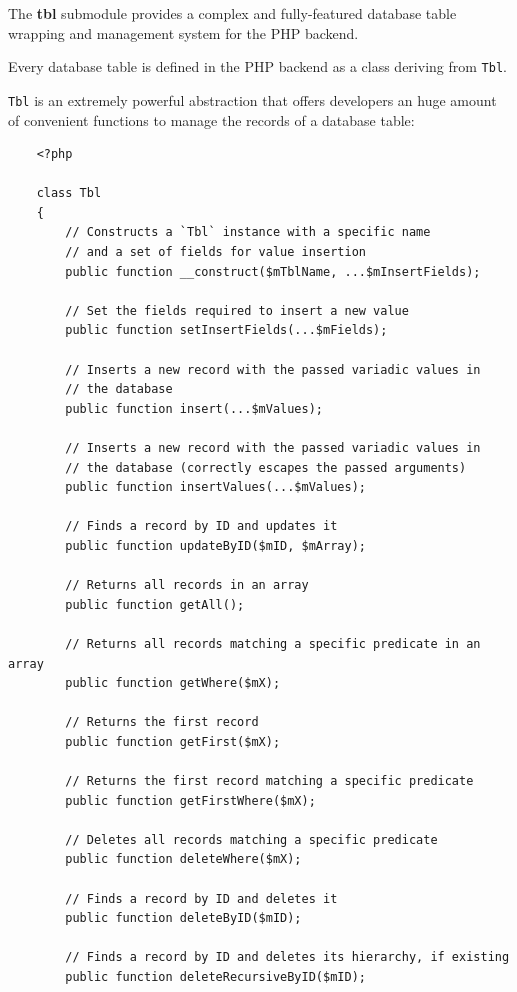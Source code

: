 \documentclass[12pt]{report}
\renewcommand\emph{\textbf}
\begin{document}
                    The \emph{tbl} submodule provides a complex and fully-featured database table wrapping and management system for the PHP backend.

                    Every database table is defined in the PHP backend as a class deriving from \texttt{Tbl}. 

                    \texttt{Tbl} is an extremely powerful abstraction that offers developers an huge amount of convenient functions to manage the records of a database table:

                    \begin{verbatim}
    <?php

    class Tbl
    {
        // Constructs a `Tbl` instance with a specific name
        // and a set of fields for value insertion
        public function __construct($mTblName, ...$mInsertFields);

        // Set the fields required to insert a new value
        public function setInsertFields(...$mFields);

        // Inserts a new record with the passed variadic values in
        // the database
        public function insert(...$mValues);

        // Inserts a new record with the passed variadic values in
        // the database (correctly escapes the passed arguments)
        public function insertValues(...$mValues);

        // Finds a record by ID and updates it
        public function updateByID($mID, $mArray);

        // Returns all records in an array
        public function getAll();

        // Returns all records matching a specific predicate in an array
        public function getWhere($mX);

        // Returns the first record
        public function getFirst($mX);

        // Returns the first record matching a specific predicate
        public function getFirstWhere($mX);

        // Deletes all records matching a specific predicate
        public function deleteWhere($mX);

        // Finds a record by ID and deletes it
        public function deleteByID($mID);

        // Finds a record by ID and deletes its hierarchy, if existing
        public function deleteRecursiveByID($mID);
        

\end{verbatim}
\end{document}

